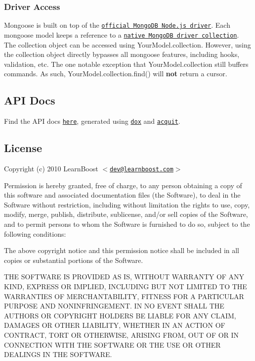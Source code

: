 \subsubsection*{Driver Access}

Mongoose is built on top of the \href{https://github.com/mongodb/node-mongodb-native}{\tt official Mongo\+DB Node.\+js driver}. Each mongoose model keeps a reference to a \href{http://mongodb.github.io/node-mongodb-native/2.1/api/Collection.html}{\tt native Mongo\+DB driver collection}. The collection object can be accessed using {\ttfamily Your\+Model.\+collection}. However, using the collection object directly bypasses all mongoose features, including hooks, validation, etc. The one notable exception that {\ttfamily Your\+Model.\+collection} still buffers commands. As such, {\ttfamily Your\+Model.\+collection.\+find()} will {\bfseries not} return a cursor.

\subsection*{A\+PI Docs}

Find the A\+PI docs \href{http://mongoosejs.com/docs/api.html}{\tt here}, generated using \href{https://github.com/tj/dox}{\tt dox} and \href{https://github.com/vkarpov15/acquit}{\tt acquit}.

\subsection*{License}

Copyright (c) 2010 Learn\+Boost $<$\href{mailto:dev@learnboost.com}{\tt dev@learnboost.\+com}$>$

Permission is hereby granted, free of charge, to any person obtaining a copy of this software and associated documentation files (the \textquotesingle{}Software\textquotesingle{}), to deal in the Software without restriction, including without limitation the rights to use, copy, modify, merge, publish, distribute, sublicense, and/or sell copies of the Software, and to permit persons to whom the Software is furnished to do so, subject to the following conditions\+:

The above copyright notice and this permission notice shall be included in all copies or substantial portions of the Software.

T\+HE S\+O\+F\+T\+W\+A\+RE IS P\+R\+O\+V\+I\+D\+ED \textquotesingle{}AS IS\textquotesingle{}, W\+I\+T\+H\+O\+UT W\+A\+R\+R\+A\+N\+TY OF A\+NY K\+I\+ND, E\+X\+P\+R\+E\+SS OR I\+M\+P\+L\+I\+ED, I\+N\+C\+L\+U\+D\+I\+NG B\+UT N\+OT L\+I\+M\+I\+T\+ED TO T\+HE W\+A\+R\+R\+A\+N\+T\+I\+ES OF M\+E\+R\+C\+H\+A\+N\+T\+A\+B\+I\+L\+I\+TY, F\+I\+T\+N\+E\+SS F\+OR A P\+A\+R\+T\+I\+C\+U\+L\+AR P\+U\+R\+P\+O\+SE A\+ND N\+O\+N\+I\+N\+F\+R\+I\+N\+G\+E\+M\+E\+NT. IN NO E\+V\+E\+NT S\+H\+A\+LL T\+HE A\+U\+T\+H\+O\+RS OR C\+O\+P\+Y\+R\+I\+G\+HT H\+O\+L\+D\+E\+RS BE L\+I\+A\+B\+LE F\+OR A\+NY C\+L\+A\+IM, D\+A\+M\+A\+G\+ES OR O\+T\+H\+ER L\+I\+A\+B\+I\+L\+I\+TY, W\+H\+E\+T\+H\+ER IN AN A\+C\+T\+I\+ON OF C\+O\+N\+T\+R\+A\+CT, T\+O\+RT OR O\+T\+H\+E\+R\+W\+I\+SE, A\+R\+I\+S\+I\+NG F\+R\+OM, O\+UT OF OR IN C\+O\+N\+N\+E\+C\+T\+I\+ON W\+I\+TH T\+HE S\+O\+F\+T\+W\+A\+RE OR T\+HE U\+SE OR O\+T\+H\+ER D\+E\+A\+L\+I\+N\+GS IN T\+HE S\+O\+F\+T\+W\+A\+RE. 